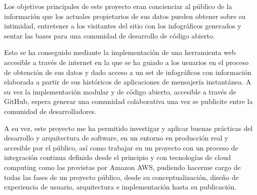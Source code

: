 
Los objetivos principales de este proyecto eran concienciar al público de la información que los actuales propietarios de sus datos pueden obtener sobre su intimidad, entretener a los visitantes del sitio con los infográficos generados y sentar las bases para una comunidad de desarrollo de código abierto.

Esto se ha conseguido mediante la implementación de una herramienta web accesible a través de internet\cite{Plataforma} en la que se ha guiado a los usuarios en el proceso de obtención de sus datos y dado acceso a un set de infográficos con información elaborada a partir de sus históricos de aplicaciones de mensajería instantánea. A su vez la implementación modular y de código abierto, accesible a través de GitHub\cite{Repositorio}, espera generar una comunidad colaborativa una vez se publicite entre la comunidad de desarrolladores.

A su vez, este proyecto me ha permitido investigar y aplicar buenas prácticas del desarrollo y arquitectura de software, en un entorno en producción real y accesible por el público, así como trabajar en un proyecto con un proceso de integración continua definido desde el principio y con tecnologías de cloud computing como las provistas por Amazon AWS, pudiendo hacerme cargo de todas las fases de un proyecto público, desde su conceptualización, diseño de experiencia de usuario, arquitectura e implementación hasta su publicación.
